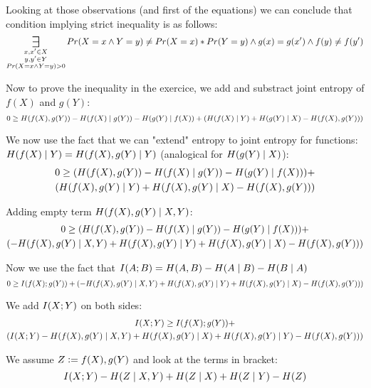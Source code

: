 Looking at those observations (and first of the equations) we can conclude that condition implying strict inequality is as follows:
\begin{equation}
\bigexists_{\substack{x, x' \in X \\ y, y' \in Y \\ \prob{X=x \land Y=y} > 0}}{\prob{X=x \land Y=y} \neq \prob{X=x}*\prob{Y=y} \land g(x) = g(x') \land f(y) \neq f(y')}
\end{equation}

Now to prove the inequality in the exercice, we add and substract joint entropy of $f(X)$ and $g(Y)$:
\begin{equation}
0 \geq \pre{f(X), g(Y)} - \pre{f(X)}[g(Y)] - \pre{g(Y)}[f(X)] + (\pre{f(X)}[Y] + \pre{g(Y)}[X] - \pre{f(X), g(Y)})
\end{equation}

We now use the fact that we can "extend" entropy to joint entropy for functions: $\pre{f(X)}[Y] = \pre{f(X),g(Y)}[Y]$ (analogical for $\pre{g(Y)}[X]$):
\begin{gather*}
0 \geq (\pre{f(X), g(Y)} - \pre{f(X)}[g(Y)] - \pre{g(Y)}[f(X)]) + \\
    (\pre{f(X),g(Y)}[Y] + \pre{f(X),g(Y)}[X] - \pre{f(X), g(Y)})
\end{gather*}

Adding empty term $\pre{f(X),g(Y)}[X,Y]$:
\begin{gather*}
0 \geq (\pre{f(X), g(Y)} - \pre{f(X)}[g(Y)] - \pre{g(Y)}[f(X)]) + \\
(-\pre{f(X),g(Y)}[X,Y] + \pre{f(X),g(Y)}[Y] + \pre{f(X),g(Y)}[X] - \pre{f(X), g(Y)})
\end{gather*}

Now we use the fact that $\pri{A; B} = \pre{A,B} - \pre{A}[B] - \pre{B}[A]$
\begin{equation}
0 \geq \pri{f(X); g(Y)} + (- \pre{f(X),g(Y)}[X,Y] + \pre{f(X),g(Y)}[Y] + \pre{f(X),g(Y)}[X] - \pre{f(X), g(Y)})
\end{equation}

We add $\pri{X;Y}$ on both sides:
\begin{gather*}
\pri{X;Y} \geq \pri{f(X); g(Y)} + \\
(\pri{X;Y} - \pre{f(X),g(Y)}[X,Y] + \pre{f(X),g(Y)}[X] + \pre{f(X),g(Y)}[Y] - \pre{f(X), g(Y)})
\end{gather*}

We assume $Z \vcentcolon= f(X),g(Y)$ and look at the terms in bracket:
\begin{equation}
\pri{X;Y} - \pre{Z}[X,Y] + \pre{Z}[X] + \pre{Z}[Y] - \pre{Z}
\end{equation}

